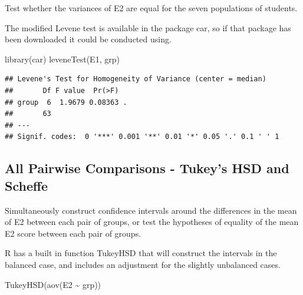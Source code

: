 \documentclass[
]{book}
\newenvironment{Shaded}{\begin{snugshade}}{\end{snugshade}}
\newcommand{\FunctionTok}[1]{\textcolor[rgb]{0.00,0.00,0.00}{#1}}
\newcommand{\NormalTok}[1]{#1}
\newcommand{\SpecialCharTok}[1]{\textcolor[rgb]{0.00,0.00,0.00}{#1}}
\begin{document}
Test whether the variances of E2 are equal for the seven populations of students.

The modified Levene test is available in the package car, so if that package has been downloaded it could be conducted using.

\begin{Shaded}
\begin{Highlighting}[]
\FunctionTok{library}\NormalTok{(car)}
\FunctionTok{leveneTest}\NormalTok{(E1, grp)}
\end{Highlighting}
\end{Shaded}

\begin{verbatim}
## Levene's Test for Homogeneity of Variance (center = median)
##       Df F value  Pr(>F)  
## group  6  1.9679 0.08363 .
##       63                  
## ---
## Signif. codes:  0 '***' 0.001 '**' 0.01 '*' 0.05 '.' 0.1 ' ' 1
\end{verbatim}

\hypertarget{all-pairwise-comparisons---tukeys-hsd-and-scheffe}{%
\subsection{All Pairwise Comparisons - Tukey's HSD and Scheffe}\label{all-pairwise-comparisons---tukeys-hsd-and-scheffe}}

Simultaneously construct confidence intervals around the differences in the mean of E2 between each pair of groups, or test the hypotheses of equality of the mean E2 score between each pair of groups.

R has a built in function TukeyHSD that will construct the intervals in the balanced case, and includes an adjustment for the slightly unbalanced cases.

\begin{Shaded}
\begin{Highlighting}[]
\FunctionTok{TukeyHSD}\NormalTok{(}\FunctionTok{aov}\NormalTok{(E2 }\SpecialCharTok{\textasciitilde{}}\NormalTok{ grp))}
\end{Highlighting}
\end{Shaded}
\end{document}
